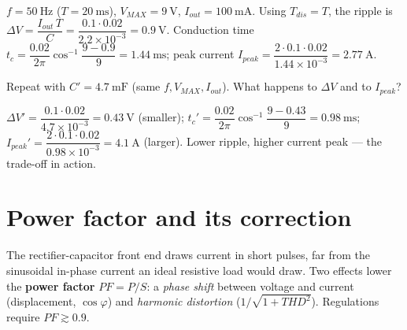 \documentclass[11pt,a4paper,oneside]{book}
\begin{document}
\begin{wexample}[Full-wave filter, $C=\qty{2.2}{\milli\farad}$]
$f=\qty{50}{\hertz}$ ($T=\qty{20}{\milli\second}$), $V_{MAX}=\qty{9}{\volt}$,
$I_{out}=\qty{100}{\milli\ampere}$. Using $T_{dis}=T$, the
ripple is $\Delta V=\dfrac{I_{out}\,T}{C}=\dfrac{0.1\cdot0.02}{2.2\times10^{-3}}
=\qty{0.9}{\volt}$. Conduction time
$t_c=\dfrac{0.02}{2\pi}\cos^{-1}\!\dfrac{9-0.9}{9}=\qty{1.44}{\milli\second}$;
peak current $I_{peak}=\dfrac{2\cdot0.1\cdot0.02}{1.44\times10^{-3}}
=\qty{2.77}{\ampere}$.
\end{wexample}

\begin{exercise}
Repeat with $C'=\qty{4.7}{\milli\farad}$ (same $f,V_{MAX},I_{out}$). What happens
to $\Delta V$ and to $I_{peak}$?
\end{exercise}
\begin{solution}
$\Delta V'=\dfrac{0.1\cdot0.02}{4.7\times10^{-3}}=\qty{0.43}{\volt}$ (smaller);
$t_c'=\dfrac{0.02}{2\pi}\cos^{-1}\!\dfrac{9-0.43}{9}=\qty{0.98}{\milli\second}$;
$I_{peak}'=\dfrac{2\cdot0.1\cdot0.02}{0.98\times10^{-3}}=\qty{4.1}{\ampere}$
(larger). Lower ripple, higher current peak --- the trade-off in action.
\end{solution}

\chapter{Power factor and its correction}\label{ch:pf}

The rectifier-capacitor front end draws current in short pulses, far from the
sinusoidal in-phase current an ideal resistive load would draw. Two effects
lower the \textbf{power factor} $PF=P/S$: a \emph{phase shift} between voltage and
current (displacement, $\cos\varphi$) and \emph{harmonic distortion}
($1/\sqrt{1+THD^2}$). Regulations require $PF\gtrsim0.9$.
\end{document}
